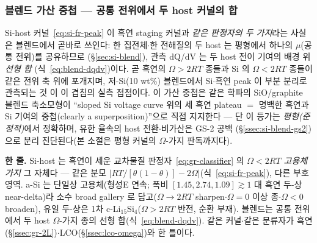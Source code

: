 \subsubsection{블렌드 가산 중첩 --- 공통 전위에서 두 host 커널의 합}\label{ssec:si-frumkin-blend}
Si-host 커널~\eqref{eq:si-fr-peak} 이 흑연 staging 커널과 \emph{같은 판정자의 두 가지}라는 사실은 블렌드에서
곧바로 쓰인다: 한 집전체$\cdot$한 전해질의 두 host 는 평형에서 하나의 $\mu$(공통 전위)를 공유하므로
(\S\ref{sec:si-blend}), 관측 dQ/dV 는 두 host 전이 기여의 배경 위 \emph{선형 합}
(식~\eqref{eq:blend-dqdv})이다. 곧 흑연의 $\Omega>2RT$ 종들과 Si 의 $\Omega<2RT$ 종들이 같은 전위 축 위에
포개지며, 저-Si(10 wt\%) 블렌드에서 Si$\cdot$흑연 peak 이 부분 분리로 관측되는 것\cite{naboka_sic2021} 이 이
겹침의 실측 접점이다. 이 가산 중첩은 같은 학파의 SiO/graphite 블렌드 축소모형이 ``sloped Si voltage curve 위의
세 흑연 plateau $=$ 명백한 흑연과 Si 기여의 중첩(clearly a superposition)''으로 직접 지지한다\cite{tu_blend2024}
--- 단 이 등가는 \emph{평형(준정적)}에서 정확하며, 유한 율속의 host 전환$\cdot$비가산은 GS-2 공백
(\S\ref{ssec:si-blend-gs2})으로 분리 진단된다(본 소절은 평형 커널의 $\Omega$-가지 판독까지다).

\begin{keybox}
\textbf{한 줄.} Si-host 는 흑연이 세운 교차물질 판정자~\eqref{eq:gr-classifier} 의 \emph{$\Omega<2RT$ 고용체 가지}
그 자체다 --- 같은 분모 $|RT/[\theta(1-\theta)]-2\Omega|$(식~\eqref{eq:si-fr-peak}), 다른 부호 영역. a-Si 는
단일상 고용체(형성E 연속\cite{chevrier_dahn2009,artrith2018}; 폭비 $[1.45,2.74,1.09]\gtrsim1$ 대 흑연 두-상
near-delta)라 소수 broad gallery 로 담고($\Omega\!\to\!2RT$ sharpen$\cdot$$\Omega{=}0$ 이상 종$\cdot$$\Omega<0$
broaden), 유일 두-상은 1차 c-Li$_{15}$Si$_4$($\Omega>2RT$ 반전, 순환 부재). 블렌드는 공통 전위에서 두 host
$\Omega$-가지 종의 선형 합(식~\eqref{eq:blend-dqdv}\cite{tu_blend2024}). 같은 커널$\cdot$같은 분류자가 흑연
(\S\ref{ssec:gr-2L})$\cdot$LCO(\S\ref{ssec:lco-omega})와 한 틀이다.
\end{keybox}

